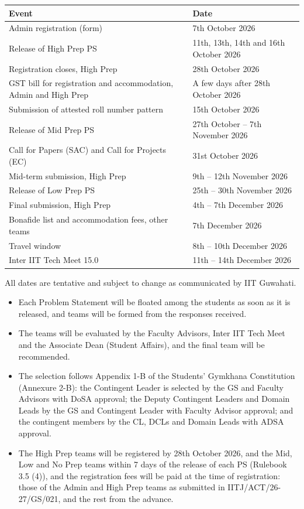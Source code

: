 \documentclass[11pt,letterpaper]{article}
\newcommand{\subhead}[1]{\par\needspace{6\baselineskip}{\bfseries #1}\par\nopagebreak}
\begin{document}
\subhead{Important dates (tentative)}
\begin{center}
\begin{tabular}{|L{8.6cm}|L{5cm}|}
\hline
\textbf{Event} & \textbf{Date} \\ \hline
Admin registration (form) & 7th October 2026 \\ \hline
Release of High Prep PS & 11th, 13th, 14th and 16th October 2026 \\ \hline
Registration closes, High Prep & 28th October 2026 \\ \hline
GST bill for registration and accommodation, Admin and High Prep & A few days after 28th October 2026 \\ \hline
Submission of attested roll number pattern & 15th October 2026 \\ \hline
Release of Mid Prep PS & 27th October -- 7th November 2026 \\ \hline
Call for Papers (SAC) and Call for Projects (EC) & 31st October 2026 \\ \hline
Mid-term submission, High Prep & 9th -- 12th November 2026 \\ \hline
Release of Low Prep PS & 25th -- 30th November 2026 \\ \hline
Final submission, High Prep & 4th -- 7th December 2026 \\ \hline
Bonafide list and accommodation fees, other teams & 7th December 2026 \\ \hline
Travel window & 8th -- 10th December 2026 \\ \hline
Inter IIT Tech Meet 15.0 & 11th -- 14th December 2026 \\ \hline
\end{tabular}
\end{center}
{\small All dates are tentative and subject to change as communicated by IIT Guwahati.}

\subhead{Team selection}
\begin{itemize}
  \item Each Problem Statement will be floated among the students as soon as it is released, and teams will be formed from the responses received.
  \item The teams will be evaluated by the Faculty Advisors, Inter IIT Tech Meet and the Associate Dean (Student Affairs), and the final team will be recommended.
  \item The selection follows Appendix 1-B of the Students' Gymkhana Constitution (Annexure 2-B): the Contingent Leader is selected by the GS and Faculty Advisors with DoSA approval; the Deputy Contingent Leaders and Domain Leads by the GS and Contingent Leader with Faculty Advisor approval; and the contingent members by the CL, DCLs and Domain Leads with ADSA approval.
  \item The High Prep teams will be registered by 28th October 2026, and the Mid, Low and No Prep teams within 7 days of the release of each PS (Rulebook 3.5 (4)), and the registration fees will be paid at the time of registration: those of the Admin and High Prep teams as submitted in IITJ/ACT/26-27/GS/021, and the rest from the advance.
\end{itemize}
\end{document}
